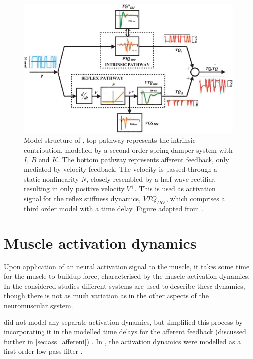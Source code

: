 \begin{figure}[t]
    \centering
    \includegraphics[width=\linewidth]{Figures/models_assumptions/model_mirbagheri_2000.png}
    \caption{Model structure of \citeauthor{mirbagheri_intrinsic_2000}, top pathway represents the intrinsic contribution, modelled by a second order spring-damper system with $I$, $B$ and $K$. The bottom pathway represents afferent feedback, only mediated by velocity feedback. The velocity is passed through a static nonlinearity $N$, closely resembled by a half-wave rectifier, resulting in only positive velocity $V^+$. This is used as activation signal for the reflex stiffness dynamics, $VTQ_{IRF}$, which comprises  a third order model with a time delay. Figure adapted from \citet{mirbagheri_intrinsic_2000}.}
    \label{fig:model_mirbagheri_2000}
\end{figure}



\section{Muscle activation dynamics}
\label{sec:muscle_act_dyn}
Upon application of an neural activation signal to the muscle, it takes some time for the muscle to buildup force, characterised by the muscle activation dynamics. In the considered studies different systems are used to describe these dynamics, though there is not as much variation as in the other aspects of the neuromuscular system. 

\citeauthor{zhang_simultaneous_1997} did not model any separate activation dynamics, but simplified this process by incorporating it in the modelled time delays for the afferent feedback (discussed further in \autoref{sec:ass_afferent}) \cite{zhang_simultaneous_1997}. In \citeauthor{van_der_helm_identification_2002}, the activation dynamics were modelled as a first order low-pass filter \cite{van_der_helm_identification_2002}. 

